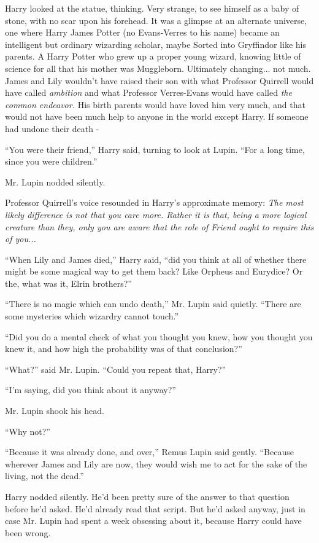 Harry looked at the statue, thinking. Very strange, to see himself as a
baby of stone, with no scar upon his forehead. It was a glimpse at an
alternate universe, one where Harry James Potter (no Evans-Verres to his
name) became an intelligent but ordinary wizarding scholar, maybe Sorted
into Gryffindor like his parents. A Harry Potter who grew up a proper
young wizard, knowing little of science for all that his mother was
Muggleborn. Ultimately changing... not much. James and Lily
wouldn't have raised their son with what Professor Quirrell would have
called \emph{ambition} and what Professor Verres-Evans would have called
\emph{the common endeavor.} His birth parents would have loved him very
much, and that would not have been much help to anyone in the world
except Harry. If someone had undone their death -

``You were their friend,'' Harry said, turning to look at Lupin. ``For a
long time, since you were children.''

Mr. Lupin nodded silently.

Professor Quirrell's voice resounded in Harry's approximate memory:
\emph{The most likely difference is not that you care more. Rather it is
that, being a more logical creature than they, only you are aware that
the role of Friend ought to require this of you...}

``When Lily and James died,'' Harry said, ``did you think at all of
whether there might be some magical way to get them back? Like Orpheus
and Eurydice? Or the, what was it, Elrin brothers?''

``There is no magic which can undo death,'' Mr. Lupin said quietly.
``There are some mysteries which wizardry cannot touch.''

``Did you do a mental check of what you thought you knew, how you
thought you knew it, and how high the probability was of that
conclusion?''

``What?'' said Mr. Lupin. ``Could you repeat that, Harry?''

``I'm saying, did you think about it anyway?''

Mr. Lupin shook his head.

``Why not?''

``Because it was already done, and over,'' Remus Lupin said gently.
``Because wherever James and Lily are now, they would wish me to act for
the sake of the living, not the dead.''

Harry nodded silently. He'd been pretty sure of the answer to that
question before he'd asked. He'd already read that script. But he'd
asked anyway, just in case Mr. Lupin had spent a week obsessing about
it, because Harry could have been wrong.

